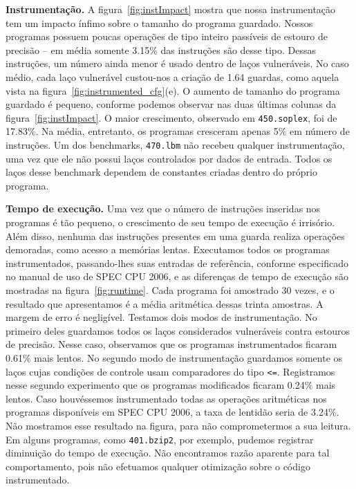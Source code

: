 \documentclass{llncs}
\begin{document}
\noindent
\textbf{Instrumentação. }
A figura~\ref{fig:instImpact} mostra que nossa instrumentação tem um
impacto ínfimo sobre o tamanho do programa guardado.
Nossos programas possuem poucas operações de tipo inteiro passíveis de estouro
de precisão -- em média somente 3.15\% das instruções são desse tipo.
Dessas instruções, um número ainda menor é usado dentro de laços vulneráveis.
No caso médio, cada laço vulnerável custou-nos a criação de 1.64 guardas, como
aquela vista na figura~\ref{fig:instrumented_cfg}(e).
O aumento de tamanho do programa guardado é pequeno, conforme podemos
observar nas duas últimas colunas da figura~\ref{fig:instImpact}.
O maior crescimento, observado em \texttt{450.soplex}, foi de 17.83\%.
Na média, entretanto, os programas cresceram apenas 5\% em número de
instruções.
Um dos benchmarks, \texttt{470.lbm} não recebeu qualquer instrumentação,
uma vez que ele não possui laços controlados por dados de entrada.
Todos os laços desse benchmark dependem de constantes criadas dentro do próprio
programa.

\noindent
\textbf{Tempo de execução. }
Uma vez que o número de instruções inseridas nos programas é tão pequeno, o
crescimento de seu tempo de execução é irrisório.
Além disso, nenhuma das instruções presentes em uma guarda realiza operações
demoradas, como acesso a memórias lentas.
Executamos todos os programas instrumentados, passando-lhes suas entradas de
referência, conforme especificado no manual de uso de SPEC CPU 2006, e as
diferenças de tempo de execução são mostradas na figura~\ref{fig:runtime}.
Cada programa foi amostrado 30 vezes, e o resultado que apresentamos é a
média aritmética dessas trinta amostras.
A margem de erro é negligível.
Testamos dois modos de instrumentação.
No primeiro deles guardamos todos os laços considerados vulneráveis contra
estouros de precisão.
Nesse caso, observamos que os programas instrumentados ficaram 0.61\% mais
lentos.
No segundo modo de instrumentação guardamos somente os laços cujas condições
de controle usam comparadores do tipo \texttt{<=}.
Registramos nesse segundo experimento que os programas modificados ficaram
0.24\% mais lentos.
Caso houvéssemos instrumentado todas as operações aritméticas nos programas
disponíveis em SPEC CPU 2006, a taxa de lentidão seria de 3.24\%.
Não mostramos esse resultado na figura, para não comprometermos a sua
leitura.
Em alguns programas, como \texttt{401.bzip2}, por exemplo, pudemos registrar
diminuição do tempo de execução.
Não encontramos razão aparente para tal comportamento, pois não efetuamos
qualquer otimização sobre o código instrumentado.
\end{document}
